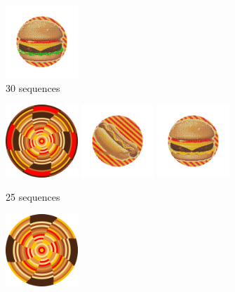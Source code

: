 \documentclass{article}
\begin{document}
\begin{figure}[ht!]
\begin{subfigure}[t]{0.4\textwidth}
\includegraphics[width=0.3\textwidth]{images/reduction/30/sim1.png}
\caption{30 sequences}
\end{subfigure}


\begin{subfigure}[t]{0.4\textwidth}
\includegraphics[width=0.3\textwidth]{images/reduction/25/disc.png}
\includegraphics[width=0.3\textwidth]{images/reduction/25/sim0.png}
\includegraphics[width=0.3\textwidth]{images/reduction/25/sim1.png}
\caption{25 sequences}
\end{subfigure}
\hfill
\begin{subfigure}[t]{0.4\textwidth}
\includegraphics[width=0.3\textwidth]{images/reduction/20/disc.png}

\end{subfigure}
\end{figure}
\end{document}
